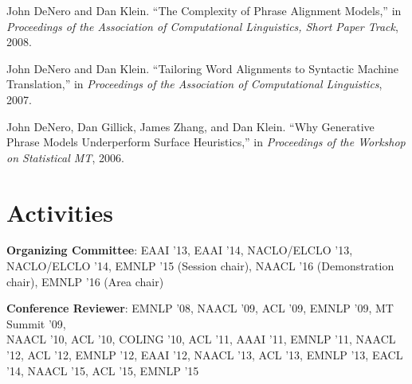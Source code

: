 \documentclass[margin,line]{res}
\begin{document}
\begin{resume}
John DeNero and Dan Klein. ``The Complexity of Phrase Alignment Models,'' in {\it Proceedings of the Association of Computational Linguistics, Short Paper Track}, 2008.

John DeNero and Dan Klein. ``Tailoring Word Alignments to Syntactic Machine Translation,'' in {\it Proceedings of the Association of Computational Linguistics}, 2007.

John DeNero, Dan Gillick, James Zhang, and Dan Klein. ``Why Generative Phrase Models Underperform Surface Heuristics,'' in {\it Proceedings of the Workshop on Statistical MT}, 2006.

\section{\sc Activities}

{\bf Organizing Committee}: EAAI '13, EAAI '14, NACLO/ELCLO '13, NACLO/ELCLO '14,
EMNLP '15 (Session chair), NAACL '16 (Demonstration chair), EMNLP '16 (Area chair)

{\bf Conference Reviewer}: EMNLP '08, NAACL '09, ACL '09, EMNLP '09, MT Summit
'09,\\ NAACL '10, ACL '10, COLING '10, ACL '11, AAAI '11, EMNLP '11, NAACL '12,
ACL '12, EMNLP '12, EAAI '12, NAACL '13, ACL '13, EMNLP '13, EACL '14,
NAACL '15, ACL '15, EMNLP '15

\end{resume}
\end{document}
